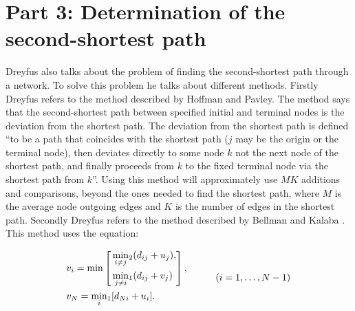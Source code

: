 \documentclass{article}
\begin{document}
\newpage

\section*{Part 3: Determination of the second-shortest path}
Dreyfus also talks about the problem of finding the second-shortest 
path through a network. To solve this problem he talks about different methods. 
Firstly Dreyfus refers to the method described by Hoffman and Pavley\cite{hoffman_pavley}. 
The method says that the second-shortest path between specified  initial and terminal 
nodes is the deviation from the shortest path. The deviation from the shortest path is 
defined “to be a path that coincides with the shortest path ($j$ may be the origin or the
terminal node), then deviates directly to some node $k$ not the next node of the shortest
path, and finally proceeds from $k$ to the fixed terminal node via the shortest path 
from $k$”. Using this method will approximately use $MK$ additions and comparisons, beyond
the ones needed to find the shortest path, where $M$ is the average node outgoing 
edges and $K$ is the number of edges in the shortest path. 
\vspace{2mm}
Secondly Dreyfus refers to the method described by Bellman and Kalaba
\cite{bellman_kalaba}. This method uses the equation:

\begin{equation}
    \begin{aligned}
        & v_{i} = \min \left[
        \begin{aligned} 
            & \min_{i \neq j}\!_2(d_{ij} + u_{j}), \\
            & \min_{j \neq i}\!_1(d_{ij} + v_{j})
        \end{aligned} 
        \right],\\
        & v_{N} = \min_{i}\!_1[d_{Ni} + u_{i}].
    \end{aligned}
    \hspace*{3em} (i = 1, \dots, N - 1) 
\end{equation}
\end{document}

